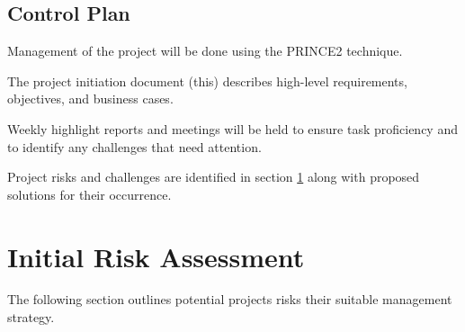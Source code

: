 \documentclass[11pt,a4paper]{article}
\begin{document}
\subsection{Control Plan}
Management of the project will be done using the PRINCE2 technique. 

The project initiation document (this) describes high-level requirements, objectives, and business cases.

Weekly highlight reports and meetings will be held to ensure task proficiency and to identify any challenges that need attention.

Project risks and challenges are identified in section \ref{sect:risk} along with proposed solutions for their occurrence.

\newpage
\section{Initial Risk Assessment}\label{sect:risk}
The following section outlines potential projects risks their suitable management strategy.
\end{document}
